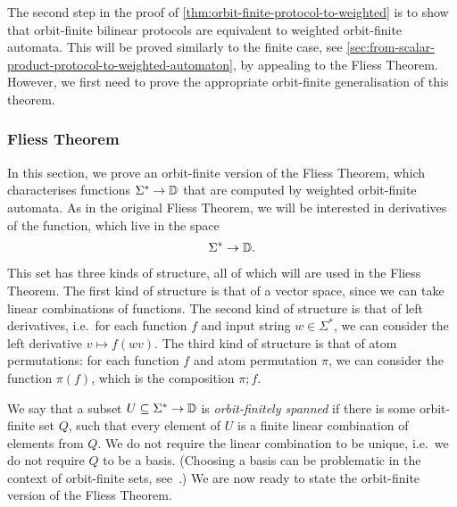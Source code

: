 The second step in the proof of \cref{thm:orbit-finite-protocol-to-weighted} is to show that orbit-finite bilinear protocols are equivalent to weighted orbit-finite automata.  This will be proved similarly to the finite case, see \cref{sec:from-scalar-product-protocol-to-weighted-automaton}, by appealing to the Fliess Theorem. However, we first  need to prove the appropriate  orbit-finite generalisation  of this theorem.

\subsubsection{Fliess Theorem}
In this section, we prove an orbit-finite version of the Fliess Theorem, which characterises functions $\Sigma^* \to \mathbb D$ that are computed by weighted orbit-finite automata. As in the original Fliess Theorem, we will be interested in derivatives of the function, which live in the space  
\begin{align*}
\Sigma^* \to \mathbb D.
\end{align*}
This set has three kinds of structure, all of which will are used in the Fliess Theorem. The first kind of structure is that of a vector space, since we can take linear combinations of functions. The second kind of structure is that of left derivatives, i.e.~for each function $f$ and input string $w \in \Sigma^*$, we can consider the left derivative $v \mapsto f(wv)$. The third kind of structure is that of atom permutations: for each function $f$ and atom permutation $\pi$, we can consider the function $\pi(f)$, which is the composition $\pi;f$.

We say that a subset  $U \subseteq \Sigma^* \to \mathbb D$  is \emph{orbit-finitely spanned} if there is some orbit-finite set $Q$, such that  every element of $U$ is a finite linear combination of elements from $Q$. We do not require the linear combination to be unique, i.e.~we do not require $Q$ to be a basis. (Choosing a basis can be problematic in the context of orbit-finite sets, see~\cite[Example 77]{bojanczyk_slightly}.) We are now ready to state the orbit-finite version of the Fliess Theorem.

